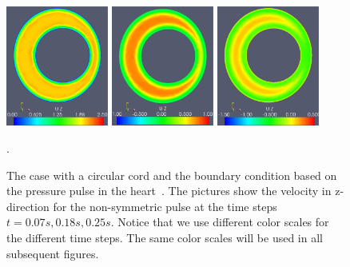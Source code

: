 \begin{figure}\begin{center}
\includegraphics[width=0.3\textwidth]{chapters/hentschel/pdf/pulse_f1_08_sysmax_nmb7.pdf}
\includegraphics[width=0.3\textwidth]{chapters/hentschel/pdf/pulse_f1_08_sysdia_nmb18.pdf}
\includegraphics[width=0.3\textwidth]{chapters/hentschel/pdf/pulse_f1_08_diamin1_nmb25.pdf}
\caption{The case with a circular cord and the boundary condition based on
the pressure pulse in the heart~\cite{SmithChase2ShawEtAl2006}. 
The pictures show the velocity in z-direction for the non-symmetric pulse at the time steps $t=0.07s, 0.18s, 0.25s$. Notice that we use different color scales for the different time steps. The same color scales
will be used in all subsequent figures. }
\label{fig:case1}.
\end{center}\end{figure}


